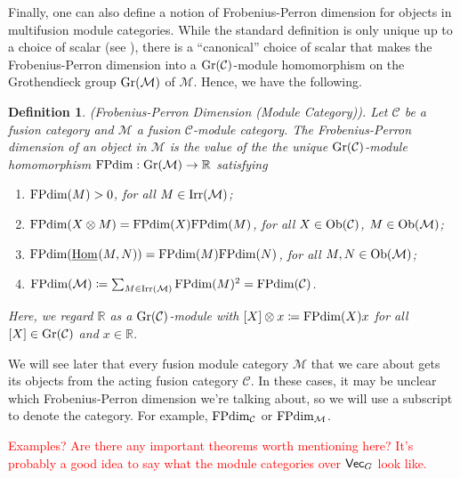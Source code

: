 \documentclass[12pt, reqno]{amsart}
\numberwithin{equation}{section}
\theoremstyle{plainspace}
\theoremstyle{definitionspace}
\newtheorem{definition}[theorem]{Definition}
\theoremstyle{remarkspace}
\newcommand{\mathcat}[1]{\mathcal{#1}}
\newcommand{\Ob}{\textup{Ob}}
\newcommand{\IntHom}[2][]{
	\ifthenelse{\equal{#2}{}}
		{\underline{\textup{Hom}}_{#1}}
		{\underline{\textup{Hom}}_{#1}\!\left(#2\right)}
}
\newcommand{\textcat}[1]{\textup{\textsf{#1}}}
\newcommand{\Irr}{\textup{Irr}}
\newcommand{\Gr}{\textup{Gr}}
\newcommand{\FPdim}{\textup{FPdim}}
\begin{document}
\noindent Finally, one can also define a notion of Frobenius-Perron dimension for objects in multifusion module categories. While the standard definition is only unique up to a choice of scalar (see \cite[Proposition 8.5]{Etingof_2005}), there is a ``canonical'' choice of scalar that makes the Frobenius-Perron dimension into a $\Gr(\mathcat{C})$-module homomorphism on the Grothendieck group $\Gr(\mathcat{M})$ of $\mathcat{M}$. Hence, we have the following.
\newline

\begin{definition}\label{def:frobenius-perron_dimension_module}{\em (Frobenius-Perron Dimension (Module Category)).} \cite[Section 2.5]{Etingof_2010}
Let $\mathcat{C}$ be a fusion category and $\mathcat{M}$ a fusion $\mathcat{C}$-module category. The {\em Frobenius-Perron dimension} of an object in $\mathcat{M}$ is the value of the the unique $\Gr(\mathcat{C})$-module homomorphism $\FPdim : \Gr(\mathcat{M}) \to \mathbb{R}$ satisfying
\begin{enumerate}[start=1, leftmargin=1.5cm, label={(\arabic*).}]
\item $\FPdim(M) > 0$, for all $M \in \Irr(\mathcat{M})$;
\item $\FPdim(X \otimes M) = \FPdim(X)\FPdim(M)$, for all $X \in \Ob(\mathcat{C})$, $M \in \Ob(\mathcat{M})$;
\item $\FPdim(\IntHom{M, N}) = \FPdim(M)\FPdim(N)$, for all $M, N \in \Ob(\mathcat{M})$;
\item $\FPdim(\mathcat{M}) \coloneqq \sum_{M \in \Irr(\mathcat{M})}{\FPdim(M)^2} = \FPdim(\mathcat{C})$.
\end{enumerate}
\noindent Here, we regard $\mathbb{R}$ as a $\Gr(\mathcat{C})$-module with $[X] \otimes x \coloneqq \FPdim(X)x$ for all $[X] \in \Gr(\mathcat{C})$ and $x \in \mathbb{R}$.
\end{definition}
\leavevmode

\noindent We will see later that every fusion module category $\mathcat{M}$ that we care about gets its objects from the acting fusion category $\mathcat{C}$. In these cases, it may be unclear which Frobenius-Perron dimension we're talking about, so we will use a subscript to denote the category. For example, $\FPdim_{\mathcat{C}}$ or $\FPdim_{\mathcat{M}}$.
\newline

\noindent \textcolor{red}{Examples? Are there any important theorems worth mentioning here? It's probably a good idea to say what the module categories over $\textcat{Vec}_G$ look like.}
\newline\newline
\end{document}
